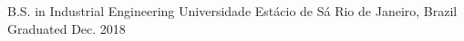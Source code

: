 


\begin{cventries}


\cventry
{B.S. in Industrial Engineering} %
{Universidade Estácio de Sá} %
{Rio de Janeiro, Brazil} %
{Graduated Dec. 2018} %
{}


\end{cventries}